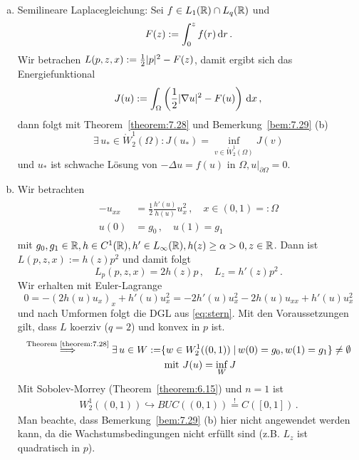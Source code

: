 \begin{bsp}
\begin{enumerate}[(a)]
\item Semilineare Laplacegleichung: Sei $f \in L_1(\mathbb{R}) \cap L_q(\mathbb{R})$ und 
\[ F(z) :=\int_0^z f(r) \,\mathrm{d} r \, . \]
Wir betrachen $L(p,z,x) := \frac 1 2 \lvert p\rvert^2 - F(z)$, damit ergibt sich das Energiefunktional
\[ J(u) := \int_\Omega \left(\frac 1 2 \lvert \nabla u\rvert^2 - F(u) \right) \,\mathrm{d} x \, ,\]
dann folgt mit Theorem~\ref{theorem:7.28} und Bemerkung~\ref{bem:7.29} (b)
\[
	\exists \, u_\ast \in \mathring W^1_2 (\Omega) : J(u_\ast) = \inf_{v \in \mathring W^1_2 (\Omega)} J(v)
\]
und $u_\ast$ ist schwache Lösung von $-\Delta u = f(u)$ in $\Omega, u|_{\partial\Omega} = 0$.
\item Wir betrachten
\begin{align*}
\label{eq:stern}
\tag{$\ast$}
\begin{aligned}
	-u_{xx}& = \frac 1 2 \frac{h'(u)}{h(u)} u_x^2 \, , \quad x \in (0,1) =: \Omega \\
	u(0) &= g_0 \, , \quad u(1) = g_1
\end{aligned}
\end{align*}
mit $g_0, g_1 \in\mathbb{R}, h \in C^1(\mathbb{R}), h'\in L_\infty (\mathbb{R}), h(z) \geq \alpha > 0, z \in \mathbb{R}$. Dann ist $L(p,z,x):=h(z) p^2$ und damit folgt
\[
	L_p (p,z,x) = 2 h(z) p \, , \quad L_z = h'(z) p^2 \, .
\]
Wir erhalten mit Euler-Lagrange
\begin{dmath*}
0 = -(2h(u)u_x)_x + h'(u) u_x^2 = -2h'(u) u_x^2 - 2h(u) u_{xx} + h'(u) u_x^2
\end{dmath*}
und nach Umformen folgt die DGL aus \eqref{eq:stern}. Mit den Voraussetzungen gilt, dass $L$ koerziv ($q=2$) und konvex in $p$ ist.
\begin{align*}
	\stackrel{\scriptsize \text{Theorem}~\ref{theorem:7.28}} {\Longrightarrow} \exists \, u \in W :=& \{ w \in W^1_2 ((0,1)) \;\vert\, w(0) = g_0, w(1) = g_1 \} \neq \emptyset \\ &\text{ mit } J(u) = \inf_W J
\end{align*}
Mit Sobolev-Morrey (Theorem~\ref{theorem:6.15}) und $n=1$ ist
\begin{align}
\label{eq:7.16}
	W^1_2((0,1)) \hookrightarrow BUC((0,1)) \stackrel ! = C([0,1])\, .
\end{align}
Man beachte, dass Bemerkung~\ref{bem:7.29} (b) hier nicht angewendet werden kann, da die Wachstumsbedingungen nicht erfüllt sind (z.B. $L_z$ ist quadratisch in $p$).


\end{enumerate}
\end{bsp}
